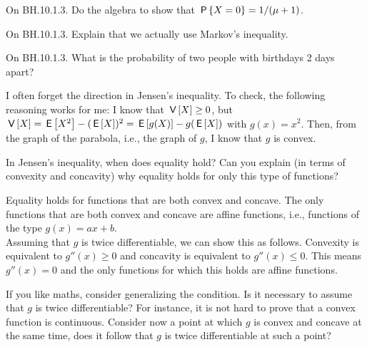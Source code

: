 \begin{exercise}
On BH.10.1.3. Do the algebra to show that $\P{X=0}=1/(\mu+1)$.
\begin{hint}
\end{hint}
\begin{solution}
\end{solution}
\end{exercise}

\begin{exercise}
On BH.10.1.3. Explain that we actually use Markov's inequality.
\begin{hint}
\end{hint}
\begin{solution}
\end{solution}
\end{exercise}

\begin{exercise}
On BH.10.1.3. What is the probability of two people with birthdays 2 days apart?
\begin{hint}
\end{hint}
\begin{solution}
\end{solution}
\end{exercise}

\begin{remark}
I often forget the direction in Jensen's inequality. To check, the following reasoning works for me: I know that $\V X \geq 0$, but $\V X = \E{X^{2}} - (\E X)^2 = \E{g(X)}-g(\E X)$ with $g(x)=x^2$. Then, from the graph of the parabola, i.e., the graph of $g$, I know that $g$ is convex.
\end{remark}


\begin{exercise}
In Jensen's inequality, when does equality hold? Can you explain (in terms of convexity and concavity) why equality holds for only this type of functions?

\begin{solution}
Equality holds for functions that are both convex and concave. The only functions that are both convex and concave are affine functions, i.e., functions of the type $g(x)=a x+b$.\\
Assuming that $g$ is twice differentiable, we can show this as follows. Convexity is  equivalent to $g''(x)\geq 0$ and concavity is equivalent to $g''(x)\leq 0$. This means $g''(x)=0$ and the only functions for which this holds are affine functions.

If you like maths, consider generalizing the condition.
Is it necessary to assume that $g$ is twice differentiable?
For instance, it is not hard to prove that a convex function is continuous.
Consider now a point at which $g$ is convex and concave at the same time, does it follow that $g$ is twice differentiable at such a point?
\end{solution}
\end{exercise}

